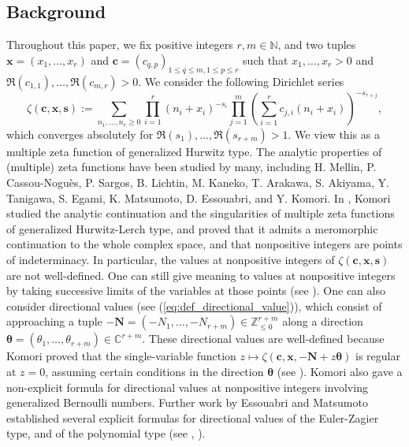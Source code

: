 \documentclass[a4paper]{amsart}
\theoremstyle{remark}
\theoremstyle{definition}
\begin{document}
\subsection{Background}
Throughout this paper, we fix positive integers $r,m \in \mathbb{N}$, and two tuples $\mathbf{x}=(x_1,\ldots,x_r)$ and $\mathbf{c}=(c_{q,p})_{1 \leq q \leq m, 1 \leq p \leq r}$ such that $x_1,\ldots,x_r>0$ and $\Re(c_{1,1}),\ldots,\Re(c_{m,r})>0$. We consider the following Dirichlet series
\begin{equation}
    \zeta(\mathbf{c},\mathbf{x},\mathbf{s}) := \sum_{n_1, \ldots, n_r \geq 0} \prod_{i=1}^{r} (n_i+x_i)^{-s_i} \prod_{j=1}^{m} \left( \sum_{i=1}^r c_{j,i} (n_i+x_i) \right)^{-s_{r+j}}, \label{eq:def_multiple_zeta_function_hurwitz_type}
\end{equation}
which converges absolutely for $\Re(s_1),\ldots,\Re(s_{r+m})>1$. We view this as a multiple zeta function of generalized Hurwitz type. The analytic properties of (multiple) zeta functions have been studied by many, including H. Mellin, P. Cassou-Noguès, P. Sargos, B. Lichtin, M. Kaneko, T. Arakawa, S. Akiyama, Y. Tanigawa, S. Egami, K. Matsumoto, D. Essouabri, and Y. Komori. In \cite{komori2010integral}, Komori studied the analytic continuation and the singularities of multiple zeta functions of generalized Hurwitz-Lerch type, and proved that it admits a meromorphic continuation to the whole complex space, and that nonpositive integers are points of indeterminacy. In particular, the values at nonpositive integers of $\zeta(\mathbf{c},\mathbf{x},\mathbf{s})$ are not well-defined. One can still give meaning to values at nonpositive integers by taking successive limits of the variables at those points (see \cite{akiyama2001multiple}). One can also consider directional values (see (\ref{eq:def_directional_value})), which consist of approaching a tuple $-\mathbf{N}=(-N_1,\ldots,-N_{r+m}) \in \mathbb{Z}_{\leq 0}^{r+m}$ along a direction $\bm{\theta}=(\theta_1,\ldots,\theta_{r+m}) \in \mathbb{C}^{r+m}$. These directional values are well-defined because Komori proved that the single-variable function $z \mapsto \zeta(\mathbf{c},\mathbf{x},-\mathbf{N}+z\bm{\theta})$ is regular at $z=0$, assuming certain conditions in the direction $\bm{\theta}$ (see \cite[Theorem 3.22]{komori2010integral}). Komori also gave a non-explicit formula for directional values at nonpositive integers involving generalized Bernoulli numbers. Further work by Essouabri and Matsumoto established several explicit formulas for directional values of the Euler-Zagier type, and of the polynomial type (see \cite{essouabri20valueseulerzagier}, \cite{essouabri2021values}).
\end{document}
